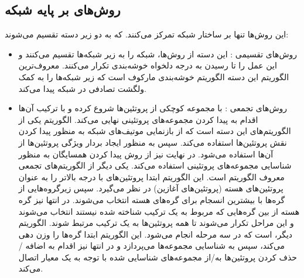 \subsection{روش‌های بر پایه شبکه}
این روش‌ها تنها بر ساختار شبکه  تمرکز می‌کنند. که به دو زیر دسته تقسیم می‌شوند:
\begin{itemize}
    \item روش‌های تقسیمی : این دسته از روش‌ها، شبکه را به زیر شبکه‌ها تقسیم می‌کنند و این عمل را تا رسیدن به درجه دلخواه خوشه‌بندی تکرار می‌کنند. معروف‌ترین الگوریتم‌ این دسته الگوریتم خوشه‌بندی مارکوف  \cite{2012markov} است که زیر شبکه‌ها را به کمک ولگشت تصادفی  در شبکه پیدا می‌کند.
    \item روش‌های تجمعی : با مجموعه کوچکی از پروتئین‌ها شروع کرده و با ترکیب آن‌ها اقدام به پیدا کردن مجموعه‌های پروتئینی نهایی می‌کند. الگوریتم  \cite{2020motif} یکی از الگوریتم‌‌های این دسته است که از بازنمایی موتیف‌های  شبکه به منظور پیدا کردن نقش پروتئین‌ها استفاده می‌کند. سپس به منظور ایجاد بردار ویژگی‌ پروتئین‌ها از آن‌ها استفاده می‌شود. در نهایت نیز از روش پیدا کردن همسایگان به منظور شناسایی مجموعه‌های پروتئینی استفاده می‌کند. یکی دیگر از الگوریتم‌های تجمعی معروف الگوریتم  \cite{2012clusterone} است. این الگوریتم ابتدا پروتئین‌های با درجه‌ بالاتر را به عنوان پروتئین‌های هسته (پروتئین‌های آغازین)‌ در نظر می‌گیرد. سپس زیرگروه‌هایی از گره‌ها با بیشترین انسجام برای گره‌های هسته انتخاب می‌شوند. در انتها نیز گره هسته از بین گره‌هایی که مربوط به یک ترکیب شناخته شده نیستند انتخاب می‌شوند و این مراحل تکرار می‌شوند تا همه پروتئین‌ها به یک ترکیب مرتبط شوند. الگوریتم دیگر،   \cite{2003mcode} است که در سه مرحله انجام می‌شود. این الگوریتم ابتدا گره‌ها را وزن دهی می‌کند، سپس به شناسایی مجموعه‌ها می‌پردازد و در انتها نیز اقدام به اضافه / حذف کردن پروتئين‌ها به/از مجموعه‌های شناسایی شده با توجه به یک معیار اتصال می‌کند.
\end{itemize}

